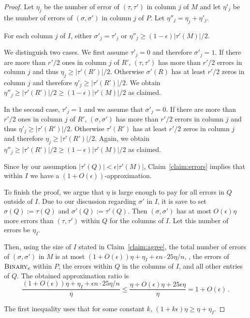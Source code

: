 \begin{proof}
   Let $\eta_j$ be the number of error of $(\tau,\tau')$ in column $j$ of $M$ and
   let $\eta'_j$ be the number of errors of $(\sigma,\sigma')$ in column $j$ of $P$.
   Let $\eta''_j = \eta_j + \eta'_j$.
   \begin{claim}\label{claim:errors}
       For each column $j$ of $I$, either $\sigma'_j = \tau'_j$ or $\eta''_j \ge (1-\epsilon)|\tau'(M)|/2$.
   \end{claim}
   \begin{subproof}
   We distinguish two cases.
   We first assume $\tau'_j = 0$ and therefore $\sigma'_j = 1$.
   If there are more than $r'/2$ ones in column $j$ of $R'$, $(\tau,\tau')$ has more than $r'/2$ errors in column $j$ and thus 
   $\eta_j \ge |\tau'(R')|/2$.
   Otherwise $\sigma'(R)$ has at least $r'/2$ zeros in column $j$ and therefore $\eta'_j \ge |\tau'(R')|/2$.
   We obtain $\eta''_j \ge |\tau'(R')|/2 \ge (1-\epsilon) |\tau'(M)|/2$ as claimed.

   In the second case, $\tau'_j = 1$ and we assume that $\sigma'_j = 0$.
   If there are more than $r'/2$ ones in column $j$ of $R'$, $(\sigma,\sigma')$ has more than $r'/2$ errors in column $j$ and thus $\eta'_j \ge |\tau'(R')|/2$.
   Otherwise $\tau'(R')$ has at least $r'/2$ zeros in column $j$ and therefore $\eta_j \ge |\tau'(R')|/2$.
   Again, we obtain $\eta''_j \ge |\tau'(R')|/2 \ge (1-\epsilon) |\tau'(M)|/2$ as claimed.
   \end{subproof}

   Since by our assumption $|\tau'(Q)| < \epsilon |\tau'(M)|$,
   Claim~\ref{claim:errors} implies that within $I$ we have a $(1+ O(\epsilon))$-approximation.

    To finish the proof, we argue that $\eta$ is large enough to pay for all errors in $Q$ outside of $I$.
    Due to our discussion regarding $\sigma'$ in $I$, it is save to
    set $\sigma(Q) := \tau(Q)$ and $\sigma'(Q) := \tau'(Q)$.
    Then $(\sigma,\sigma')$ has at most $O(\epsilon) \eta$ more errors than $(\tau,\tau')$ within $Q$ for the columns of $I$.
    Let this number of errors be $\eta_I$.

    Then, using the size of $I$ stated in Claim~\ref{claim:agree}, the total number of errors of $(\sigma,\sigma')$ in $M$ is at most
    $(1+O(\epsilon)) \eta + \eta_I + \epsilon n \cdot 25\eta/n$, \ie, the errors of $\textsc{Binary}_{\epsilon}$ within $P$, the errors within $Q$ in the columns of $I$, and all other entries of $Q$.
    The obtained approximation ratio is
    \[
            \frac{(1+O(\epsilon)) \eta + \eta_I + \epsilon n \cdot 25\eta/n}{\eta} 
        \le \frac{\eta + O(\epsilon) \eta + 25 \epsilon \eta}{\eta}
        = 1 +  O(\epsilon)\,.
    \]
    
    
    The first inequality uses that for some constant $k$, $(1 + k \epsilon) \eta \ge \eta + \eta_I$.
\end{proof}

